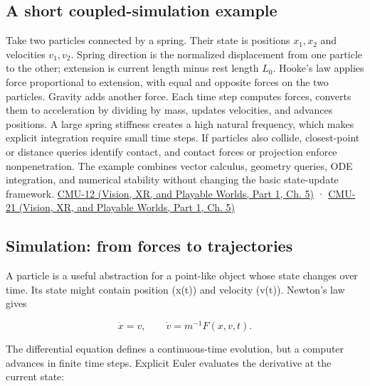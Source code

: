 \subsection{A short coupled-simulation example}\label{04-visual-computing-ii-ch029-a-short-coupled-simulation-example}

\hypertarget{04-visual-computing-ii-ch029-a-short-coupled-simulation-example}{}

Take two particles connected by a spring. Their state is positions \(x_1,x_2\) and velocities \(v_1,v_2\). Spring direction is the normalized displacement from one particle to the other; extension is current length minus rest length \(L_0\). Hooke's law applies force proportional to extension, with equal and opposite forces on the two particles. Gravity adds another force. Each time step computes forces, converts them to acceleration by dividing by mass, updates velocities, and advances positions. A large spring stiffness creates a high natural frequency, which makes explicit integration require small time steps. If particles also collide, closest-point or distance queries identify contact, and contact forces or projection enforce nonpenetration. The example combines vector calculus, geometry queries, ODE integration, and numerical stability without changing the basic state-update framework. \href{../07-Vision-XR-and-Playable-Worlds-P01/main.pdf\#nameddest=04-visual-computing-ii-ch036-cmu-12---geometric-queries}{CMU-12 (Vision, XR, and Playable Worlds, Part 1, Ch. 5)} · \href{../07-Vision-XR-and-Playable-Worlds-P01/main.pdf\#nameddest=04-visual-computing-ii-ch036-cmu-21---dynamics-and-time-integration}{CMU-21 (Vision, XR, and Playable Worlds, Part 1, Ch. 5)}

\subsection{Simulation: from forces to trajectories}\label{04-visual-computing-ii-ch029-simulation-from-forces-to-trajectories}

\hypertarget{04-visual-computing-ii-ch029-simulation-from-forces-to-trajectories}{}

A particle is a useful abstraction for a point-like object whose state changes over time. Its state might contain position (x(t)) and velocity (v(t)). Newton's law gives

\[
\dot{x}=v,\qquad \dot{v}=m^{-1}F(x,v,t).
\]

The differential equation defines a continuous-time evolution, but a computer advances in finite time steps. Explicit Euler evaluates the derivative at the current state:


